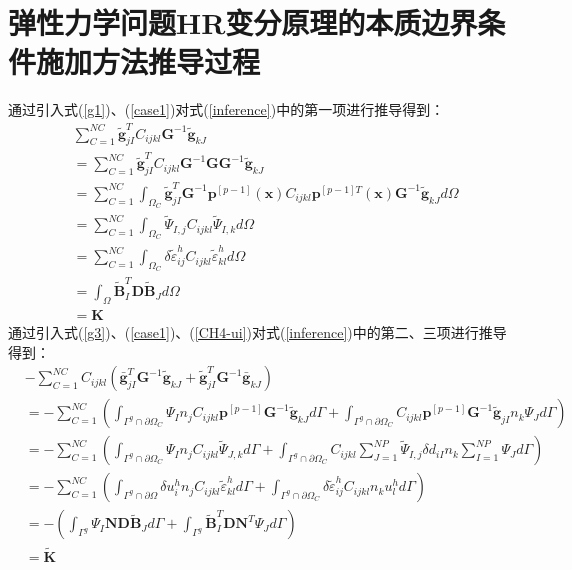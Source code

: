 \chapter{弹性力学问题HR变分原理的本质边界条件施加方法推导过程}\label{A}
通过引入式(\ref{g1})、(\ref{case1})对式(\ref{inference})中的第一项进行推导得到：
\begin{equation}\label{CH4-K}
\begin{split}
    &\sum_{C=1}^{N\!C}\tilde{\pmb g}^T_{jI}C_{ijkl}\pmb{G}^{-1}\tilde{\pmb g}_{kJ}\\
&=\sum_{C=1}^{N\!C}\tilde{\pmb g}^T_{jI}C_{ijkl}\pmb{G}^{-1}\pmb{G}\pmb{G}^{-1}\tilde{\pmb g}_{kJ}\\
&=\sum_{C=1}^{N\!C}\int_{\Omega_C}\tilde{\pmb g}_{jI}^T\pmb{G}^{-1}\pmb{p}^{[p-1]}(\pmb x)C_{ijkl}\pmb{p}^{[p-1]T}(\pmb{x})\pmb{G}^{-1}\tilde{\pmb g}_{kJ}d\Omega\\
&=\sum_{C=1}^{N\!C}\int_{\Omega_C}\tilde{\Psi}_{I,j}C_{ijkl}\tilde{\Psi}_{I,k}d\Omega\\
&=\sum_{C=1}^{N\!C}\int_{\Omega_C}\delta\tilde{\varepsilon}_{ij}^hC_{ijkl}\tilde{\varepsilon}_{kl}^hd\Omega\\
&=\int_{\Omega}\tilde{\pmb{B}}_I^T\pmb{D}\tilde{\pmb{B}}_Jd\Omega\\
&=\pmb{K}
\end{split}
\end{equation}
\newpage
通过引入式(\ref{g3})、(\ref{case1})、(\ref{CH4-ui})对式(\ref{inference})中的第二、三项进行推导得到：
\begin{equation}\label{CH4-tildeK}
\begin{split}
    &-\sum_{C=1}^{N\!C}C_{ijkl}(\bar{\pmb g}_{jI}^T\pmb{G}^{-1}\tilde{\pmb g}_{kJ}+\tilde{\pmb g}_{jI}^T\pmb{G}^{-1}\bar{\pmb g}_{kJ})\\
    &=-\sum_{C=1}^{N\!C}(\int_{\Gamma^g\cap\partial\Omega_C}\Psi_In_jC_{ijkl}\pmb{p}^{[p-1]}\pmb{G}^{-1}\tilde{\pmb g}_{kJ}d\Gamma
    +\int_{\Gamma^g\cap\partial\Omega_C}C_{ijkl}\pmb{p}^{[p-1]}\pmb{G}^{-1}\tilde{\pmb g}_{jI}n_k\Psi_Jd\Gamma)\\
    &=-\sum_{C=1}^{N\!C}(\int_{\Gamma^g\cap\partial\Omega_C}\Psi_In_jC_{ijkl}\tilde{\Psi}_{J,k}d\Gamma
    +\int_{\Gamma^g\cap\partial\Omega_C}C_{ijkl}\sum_{J=1}^{N\!P}\tilde{\Psi}_{I,j}\delta d_{iI}n_k\sum_{I=1}^{N\!P}\Psi_Jd\Gamma)\\
    &=-\sum_{C=1}^{N\!C}(\int_{\Gamma^g\cap\partial\Omega}\delta u_i^hn_jC_{ijkl}\tilde{\varepsilon}_{kl}^hd\Gamma+\int_{\Gamma^g\cap\partial\Omega_C}\delta\tilde{\varepsilon}_{ij}^hC_{ijkl}n_ku^h_ld\Gamma)\\
    &=-(\int_{\Gamma^g}\Psi_I\pmb{N}\pmb{D}\tilde{\pmb{B}}_Jd\Gamma+\int_{\Gamma^g}\tilde{\pmb{B}}_I^T\pmb{D}\pmb{N}^T\Psi_Jd\Gamma)\\
    &=\tilde{\pmb{K}}
\end{split}
\end{equation}
